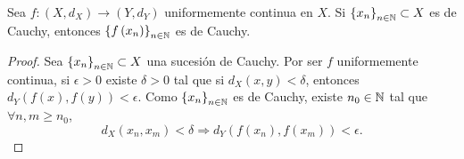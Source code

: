 \begin{lema}
	Sea $\displaystyle f : \left(X, d _{X}\right) \to \left(Y, d _{Y}\right) $ uniformemente continua en $\displaystyle X $. Si $\displaystyle \left\{ x_{n}\right\}_{n\in\mathbb{N}}\subset X $ es de Cauchy, entonces $\displaystyle \left\{ f\left(x_{n}\right)\right\} _{n\in\mathbb{N}} $ es de Cauchy.
\end{lema}
\begin{proof}
	Sea $\displaystyle \left\{ x_{n}\right\} _{n\in\mathbb{N}} \subset X $ una sucesión de Cauchy. Por ser $\displaystyle f $ uniformemente continua, si $\displaystyle \epsilon > 0 $ existe $\displaystyle \delta > 0 $ tal que si $\displaystyle d _{X}\left(x,y\right) < \delta  $, entonces $\displaystyle d _{Y}\left(f\left(x\right), f\left(y\right)\right) < \epsilon  $. Como $\displaystyle \left\{ x_{n}\right\} _{n\in\mathbb{N}} $ es de Cauchy, existe $\displaystyle n_{0} \in \mathbb{N} $ tal que $\displaystyle \forall n,m \geq n_{0} $,
	\[ d _{X}\left(x_{n}, x_{m}\right) < \delta \Rightarrow d _{Y}\left(f\left(x_{n}\right), f\left(x_{m}\right)\right) < \epsilon  .\]
\end{proof}

